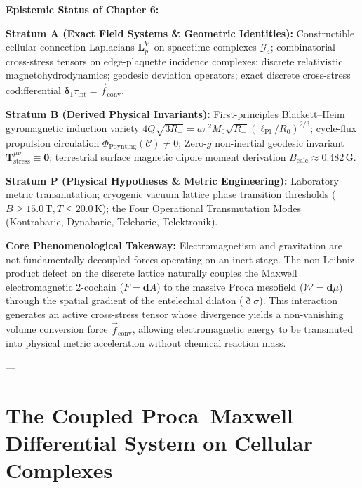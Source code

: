 \documentclass[
    12pt,
    a4paper,
    headings=normal,
    twoside=false,
    open=any,
    parskip=half
]{scrbook}
\newcommand{\ethop}{\eth}
\begin{document}
\begin{firewallbox}
\textbf{Epistemic Status of Chapter 6:}\par\smallskip\noindent
\textbf{Stratum A (Exact Field Systems \& Geometric Identities):} Constructible cellular connection Laplacians $\mathbf{L}_p^\nabla$ on spacetime complexes $\mathcal{G}_4$; combinatorial cross-stress tensors on edge-plaquette incidence complexes; discrete relativistic magnetohydrodynamics; geodesic deviation operators; exact discrete cross-stress codifferential $\boldsymbol{\delta}_1 \tau_{\text{int}} = \vec{f}_{\text{conv}}$.\par\smallskip\noindent
\textbf{Stratum B (Derived Physical Invariants):} First-principles Blackett--Heim gyromagnetic induction variety $4Q\sqrt{3R_+} = a\pi^2 M_0\sqrt{R_-}(\ell_{\text{Pl}}/R_0)^{2/3}$; cycle-flux propulsion circulation $\Phi_{\text{Poynting}}(\mathcal{C}) \ne 0$; Zero-$g$ non-inertial geodesic invariant $\mathbf{T}_{\text{stress}}^{\mu\nu} \equiv \mathbf{0}$; terrestrial surface magnetic dipole moment derivation $B_{\text{calc}} \approx 0.482\,\text{G}$.\par\smallskip\noindent
\textbf{Stratum P (Physical Hypotheses \& Metric Engineering):} Laboratory metric transmutation; cryogenic vacuum lattice phase transition thresholds ($B \ge 15.0\,\text{T}, T \le 20.0\,\text{K}$); the Four Operational Transmutation Modes (Kontrabarie, Dynabarie, Telebarie, Telektronik).\par\smallskip\noindent
\textbf{Core Phenomenological Takeaway:} Electromagnetism and gravitation are not fundamentally decoupled forces operating on an inert stage. The non-Leibniz product defect on the discrete lattice naturally couples the Maxwell electromagnetic 2-cochain ($F = \mathbf{d} A$) to the massive Proca mesofield ($\mathcal{W} = \mathbf{d} \mu$) through the spatial gradient of the entelechial dilaton ($\ethop \sigma$). This interaction generates an active cross-stress tensor whose divergence yields a non-vanishing volume conversion force $\vec{f}_{\text{conv}}$, allowing electromagnetic energy to be transmuted into physical metric acceleration without chemical reaction mass.
\end{firewallbox}

---

\section{The Coupled Proca--Maxwell Differential System on Cellular Complexes}
\label{sec:ch6_coupled_proca_maxwell_system}
\end{document}
